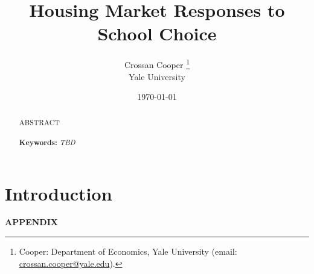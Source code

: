 \documentclass[12pt]{article}
\title{Housing Market Responses to School Choice}
\author{
\begin{tabular}{ccc}
 Crossan Cooper \thanks{\scriptsize 
Cooper: Department of Economics, Yale University (email: \href{mailto:crossan.cooper@yale.edu}{crossan.cooper@yale.edu}).} \\
Yale University
\end{tabular}
}
\date{\normalsize
\today}
\begin{document}
\maketitle

\begin{abstract}
\singlespacing
\noindent ABSTRACT \\ 

\text{} \\

\noindent \textbf{Keywords:} \textit{TBD} 

\end{abstract}
\vfill

\newpage
\tableofcontents

\doublespacing

\newpage
\section{Introduction}

\clearpage
\begin{singlespace}


\end{singlespace}

\clearpage
\let\origappendix\appendix %
\renewcommand\appendix{\clearpage{}\origappendix}

\appendix
{}
\newpage

\FloatBarrier


\begin{center}
    {\Large \textbf{APPENDIX \medskip \\}}
\end{center}
\end{document}
